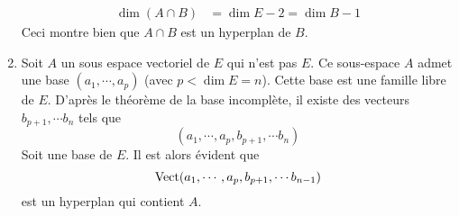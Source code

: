 \begin{enumerate}
\begin{align*}
\dim(A\cap B) &= \dim E -2 =\dim B -1 
\end{align*}
Ceci montre bien que $A\cap B$ est un hyperplan de $B$.
\item Soit $A$ un sous espace vectoriel de $E$ qui n'est pas $E$. Ce sous-espace $A$ admet une base $(a_1,\cdots,a_p)$ (avec $p<\dim E=n$). Cette base est une famille libre de $E$. D'après le théorème de la base incomplète, il existe des vecteurs $b_{p+1},\cdots b_n$ tels que 
\begin{displaymath}
 (a_1,\cdots,a_p,b_{p+1},\cdots b_n)
\end{displaymath}
Soit une base de $E$. Il est alors évident que 
\begin{displaymath}
 \operatorname{Vect}(a_1,\cdots,a_p,b_{p+1},\cdots b_{n-1})
\end{displaymath}
est un hyperplan qui contient $A$.
\end{enumerate}

